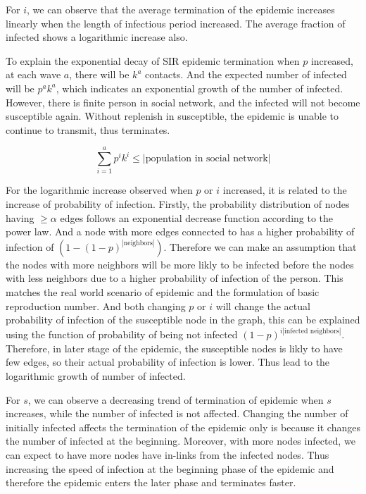 \documentclass{subfile}
\begin{document}
  For \(i\), we can observe that the average termination of the epidemic increases linearly when the length of infectious period increased. The average fraction of infected shows a logarithmic increase also.

  To explain the exponential decay of SIR epidemic termination when \(p\) increased, at each wave \(a\), there will be \(k^a\) contacts. And the expected number of infected will be \(p^a k^a\), which indicates an exponential growth of the number of infected. However, there is finite person in social network, and the infected will not become susceptible again. Without replenish in susceptible, the epidemic is unable to continue to transmit, thus terminates.

  \begin{equation*}
    \sum_{i=1}^a p^i k^i \leq |\text{population in social network}|
  \end{equation*}

  For the logarithmic increase observed when \(p\) or \(i\) increased, it is related to the increase of probability of infection. Firstly, the probability distribution of nodes having \(\geq \alpha\) edges follows an exponential decrease function according to the power law. And a node with more edges connected to has a higher probability of infection of \((1-(1-p)^{|\text{neighbors}|})\). Therefore we can make an assumption that the nodes with more neighbors will be more likly to be infected before the nodes with less neighbors due to a higher probability of infection of the person. This matches the real world scenario of epidemic and the formulation of basic reproduction number. And both changing \(p\) or \(i\) will change the actual probability of infection of the susceptible node in the graph, this can be explained using the function of probability of being not infected \( (1-p)^{i |\text{infected neighbors}|}\). Therefore, in later stage of the epidemic, the susceptible nodes is likly to have few edges, so their actual probability of infection is lower. Thus lead to the logarithmic growth of number of infected.

  For \(s\), we can observe a decreasing trend of termination of epidemic when \(s\) increases, while the number of infected is not affected. Changing the number of initially infected affects the termination of the epidemic only is because it changes the number of infected at the beginning. Moreover, with more nodes infected, we can expect to have more nodes have in-links from the infected nodes. Thus increasing the speed of infection at the beginning phase of the epidemic and therefore the epidemic enters the later phase and terminates faster.
\end{document}
